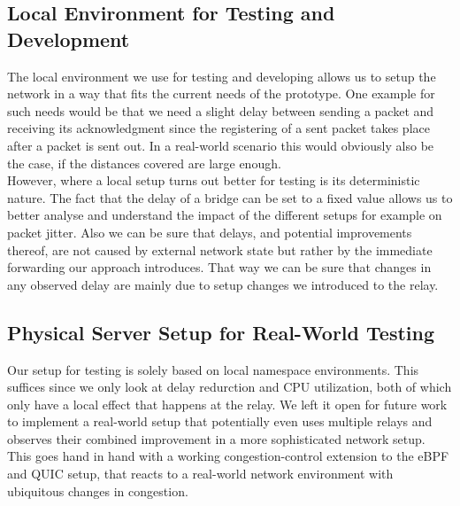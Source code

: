 \subsection{Local Environment for Testing and Development}\label{subsec:namespace_environment}
The local environment we use for testing and developing allows us to setup the network in a way 
that fits the current needs of the prototype.
One example for such needs would be that we need a slight delay between sending a packet and 
receiving its acknowledgment since the registering of a sent packet takes place after a packet 
is sent out. 
In a real-world scenario this would obviously also be the case, if the distances covered 
are large enough.
\\
However, where a local setup turns out better for testing is its deterministic nature.
The fact that the delay of a bridge can be set to a fixed value allows us to better 
analyse and understand the impact of the different setups for example on packet jitter.
Also we can be sure that delays, and potential improvements thereof, are not caused by external
network state but rather by the immediate forwarding our approach introduces.
That way we can be sure that changes in any observed delay are mainly due to setup changes 
we introduced to the relay.

\subsection{Physical Server Setup for Real-World Testing}\label{subsec:physical_server_setup}
Our setup for testing is solely based on local namespace environments.
This suffices since we only look at delay redurction and CPU utilization, 
both of which only have a local effect that happens at the relay.
We left it open for future work to implement a real-world setup that 
potentially even uses multiple relays and observes their combined improvement
in a more sophisticated network setup.
This goes hand in hand with a working congestion-control extension to the eBPF and 
QUIC setup, that reacts to a real-world network environment with ubiquitous changes 
in congestion.
